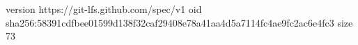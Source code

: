 version https://git-lfs.github.com/spec/v1
oid sha256:58391cdfbee01599d138f32caf29408e78a41aa4d5a7114fc4ae9fc2ac6e4fc3
size 73
